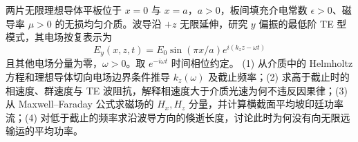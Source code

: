 两片无限理想导体平板位于 \(x=0\) 与 \(x=a\)，\(a>0\)，板间填充介电常数 \(\epsilon>0\)、磁导率 \(\mu>0\) 的无损均匀介质。波导沿 \(+z\) 无限延伸，研究 \(y\) 偏振的最低阶 TE 型模式，其电场按复表示为
\[
E_y(x,z,t)=E_0\sin(\pi x/a)e^{i(k_z z-\omega t)}
\]
且其他电场分量为零，\(\omega>0\)。取 \(e^{-i\omega t}\) 时间相位约定。
(1) 从介质中的 Helmholtz 方程和理想导体切向电场边界条件推导 \(k_z(\omega)\) 及截止频率；(2) 求高于截止时的相速度、群速度与 TE 波阻抗，解释相速度大于介质光速为何不违反因果律；(3) 从 Maxwell–Faraday 公式求磁场的 \(H_x,H_z\) 分量，并计算横截面平均坡印廷功率流；(4) 对低于截止的频率求沿波导方向的倏逝长度，讨论此时为何没有向无限远输运的平均功率。
